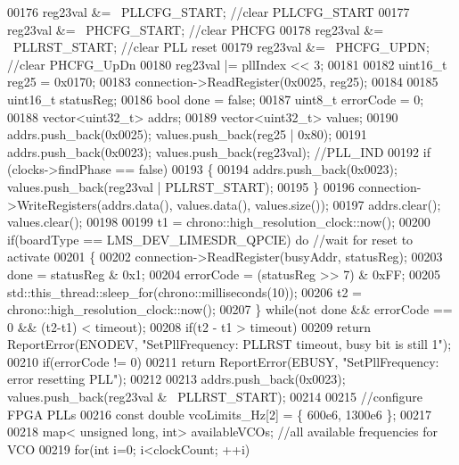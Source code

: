 \begin{DoxyCode}
{{{00176     reg23val &= ~PLLCFG\_START; \textcolor{comment}{//clear PLLCFG\_START}
00177     reg23val &= ~PHCFG\_START; \textcolor{comment}{//clear PHCFG}
00178     reg23val &= ~PLLRST\_START; \textcolor{comment}{//clear PLL reset}
00179     reg23val &= ~PHCFG\_UPDN; \textcolor{comment}{//clear PHCFG\_UpDn}
00180     reg23val |= pllIndex << 3;
00181 
00182     uint16\_t reg25 = 0x0170;
00183     connection->ReadRegister(0x0025, reg25);
00184 
00185     uint16\_t statusReg;
00186     \textcolor{keywordtype}{bool} done = \textcolor{keyword}{false};
00187     uint8\_t errorCode = 0;
00188     vector<uint32\_t> addrs;
00189     vector<uint32\_t> values;
00190     addrs.push\_back(0x0025); values.push\_back(reg25 | 0x80);
00191     addrs.push\_back(0x0023); values.push\_back(reg23val); \textcolor{comment}{//PLL\_IND}
00192     \textcolor{keywordflow}{if} (clocks->findPhase == \textcolor{keyword}{false})
00193     \{
00194         addrs.push\_back(0x0023); values.push\_back(reg23val | PLLRST\_START);
00195     \}
00196     connection->WriteRegisters(addrs.data(), values.data(), values.size());
00197     addrs.clear(); values.clear();
00198 
00199     t1 = chrono::high\_resolution\_clock::now();
00200     \textcolor{keywordflow}{if}(boardType == LMS_DEV_LIMESDR_QPCIE) \textcolor{keywordflow}{do} \textcolor{comment}{//wait for reset to activate}
00201     \{
00202         connection->ReadRegister(busyAddr, statusReg);
00203         done = statusReg & 0x1;
00204         errorCode = (statusReg >> 7) & 0xFF;
00205         std::this\_thread::sleep\_for(chrono::milliseconds(10));
00206         t2 = chrono::high\_resolution\_clock::now();
00207     \} \textcolor{keywordflow}{while}(not done && errorCode == 0 && (t2-t1) < timeout);
00208     \textcolor{keywordflow}{if}(t2 - t1 > timeout)
00209         \textcolor{keywordflow}{return} ReportError(ENODEV, \textcolor{stringliteral}{"SetPllFrequency: PLLRST timeout, busy bit is still 1"});
00210     \textcolor{keywordflow}{if}(errorCode != 0)
00211         \textcolor{keywordflow}{return} ReportError(EBUSY, \textcolor{stringliteral}{"SetPllFrequency: error resetting PLL"});
00212 
00213     addrs.push\_back(0x0023); values.push\_back(reg23val & ~PLLRST\_START);
00214 
00215     \textcolor{comment}{//configure FPGA PLLs}
00216     \textcolor{keyword}{const} \textcolor{keywordtype}{double} vcoLimits\_Hz[2] = \{ 600e6, 1300e6 \};
00217 
00218     map< unsigned long, int> availableVCOs; \textcolor{comment}{//all available frequencies for VCO}
00219     \textcolor{keywordflow}{for}(\textcolor{keywordtype}{int} i=0; i<clockCount; ++i)
}}}
\end{DoxyCode}
